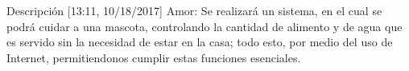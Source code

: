 Descripción
[13:11, 10/18/2017] Amor: Se realizará un sistema, en el cual se podrá cuidar a una mascota, controlando la cantidad de alimento y de agua que es servido sin la necesidad de estar en la casa; todo esto, por medio del uso de Internet, permitiendonos cumplir estas funciones esenciales.
